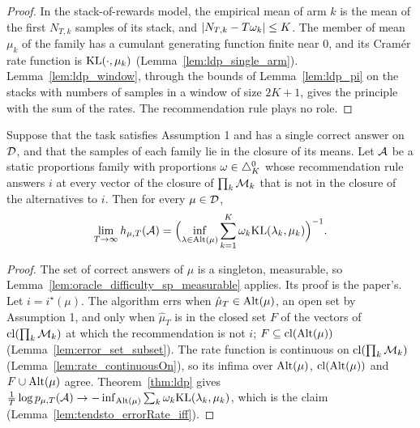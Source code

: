 \begin{proof}
  \leanok
  In the stack-of-rewards model, the empirical mean of arm $k$ is the mean of the first $N_{T,k}$
  samples of its stack, and $\lvert N_{T,k} - T \omega_k \rvert \le K$. The member of mean $\mu_k$ of the
  family has a cumulant generating function finite near $0$, and its Cramér rate function is
  $\mathrm{KL}(\cdot, \mu_k)$ (Lemma~\ref{lem:ldp_single_arm}). Lemma~\ref{lem:ldp_window}, through the
  bounds of Lemma~\ref{lem:ldp_pi} on the stacks with numbers of samples in a window of size
  $2K + 1$, gives the principle with the sum of the rates. The recommendation rule plays no role.
\end{proof}

\begin{theorem}[{\cite[Theorem 1]{D23}}]
  \label{thm:oracle_difficulty_sp}
  \leanok
  Suppose that the task satisfies Assumption 1 and has a single correct answer on $\mathcal{D}$, and that
  the samples of each family lie in the closure of its means. Let $\mathcal{A}$ be a static proportions
  family with proportions $\omega \in \triangle_K^0$ whose recommendation rule answers $i$ at every
  vector of the closure of $\prod_k \mathcal{M}_k$ that is not in the closure of the alternatives to $i$.
  Then for every $\mu \in \mathcal{D}$,
  \[ \lim_{T \to \infty} h_{\mu, T}(\mathcal{A}) = \Bigl( \inf_{\lambda \in \mathrm{Alt}(\mu)} \sum_{k=1}^K
    \omega_k \mathrm{KL}(\lambda_k, \mu_k) \Bigr)^{-1}. \]
\end{theorem}

\begin{proof}
  \leanok
  The set of correct answers of $\mu$ is a singleton, measurable, so
  Lemma~\ref{lem:oracle_difficulty_sp_measurable} applies. Its proof is the paper's. Let
  $i = i^{\star}(\mu)$. The algorithm errs when $\hat\mu_T \in \mathrm{Alt}(\mu)$, an open set by
  Assumption 1, and only when $\hat\mu_T$ is in the closed set $F$ of the vectors of
  $\mathrm{cl}(\prod_k \mathcal{M}_k)$ at which the recommendation is not $i$; $F \subseteq \mathrm{cl}(\mathrm{Alt}(\mu))$
  (Lemma~\ref{lem:error_set_subset}). The rate function is continuous on $\mathrm{cl}(\prod_k \mathcal{M}_k)$
  (Lemma~\ref{lem:rate_continuousOn}), so its infima over $\mathrm{Alt}(\mu)$, $\mathrm{cl}(\mathrm{Alt}(\mu))$ and $F
  \cup \mathrm{Alt}(\mu)$ agree. Theorem~\ref{thm:ldp} gives $\frac1T \log p_{\mu, T}(\mathcal{A}) \to -\inf_{\mathrm{Alt}(\mu)}
  \sum_k \omega_k \mathrm{KL}(\lambda_k, \mu_k)$, which is the claim
  (Lemma~\ref{lem:tendsto_errorRate_iff}).
\end{proof}

